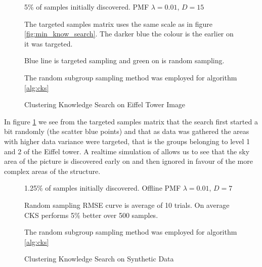 \begin{figure}[!htbp]
  \begin{center}
    \resizebox{\textwidth}{!}{}
  \end{center}
    
5\% of samples initially discovered.  PMF $\lambda = 0.01$, $D=15$

 The targeted samples matrix uses the same scale as in figure \ref{fig:min_know_search}. The darker blue the colour is the earlier on it was targeted.
 
 Blue line is targeted sampling and green on is random sampling.
 
 
 The random subgroup sampling method was employed for algorithm \ref{alg:cks}
    \caption{Clustering Knowledge Search on Eiffel Tower Image}
    \label{fig:eiffel_clustering_random}
\end{figure}

In figure \ref{fig:eiffel_clustering_random} we see from the targeted samples matrix that the search first started a bit randomly (the scatter blue points) and that as data was gathered the areas with higher data variance were targeted, that is the groups belonging to level 1 and 2 of the Eiffel tower. A realtime simulation of allows us to see that the sky area of the picture is discovered early on and then ignored in favour of the more complex areas of the structure.


\begin{figure}[!htbp]
  \begin{center}
    \resizebox{\textwidth}{!}{}
  \end{center}
    
1.25\% of samples initially discovered. Offline PMF $\lambda = 0.01$, $D=7$
 
 Random sampling RMSE curve is average of 10 trials. On average CKS performs 5\% better over 500 samples.
 
 The random subgroup sampling method was employed for algorithm \ref{alg:cks}
    \caption{Clustering Knowledge Search on Synthetic Data}
    \label{fig:synthetic_cks_rand}
\end{figure}


